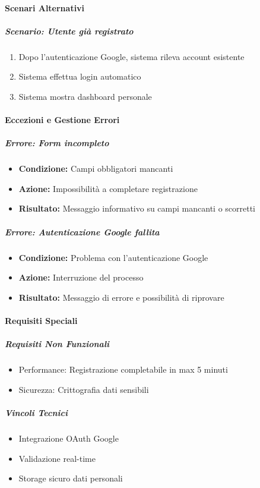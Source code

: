 \paragraph{Scenari Alternativi}

\subparagraph{Scenario: Utente già registrato}
\begin{enumerate}
\item Dopo l'autenticazione Google, sistema rileva account esistente
\item Sistema effettua login automatico
\item Sistema mostra dashboard personale
\end{enumerate}

\paragraph{Eccezioni e Gestione Errori}

\subparagraph{Errore: Form incompleto}
\begin{itemize}
\item \textbf{Condizione:} Campi obbligatori mancanti
\item \textbf{Azione:} Impossibilità a completare registrazione
\item \textbf{Risultato:} Messaggio informativo su campi mancanti o scorretti
\end{itemize}

\subparagraph{Errore: Autenticazione Google fallita}
\begin{itemize}
\item \textbf{Condizione:} Problema con l'autenticazione Google
\item \textbf{Azione:} Interruzione del processo
\item \textbf{Risultato:} Messaggio di errore e possibilità di riprovare
\end{itemize}

\paragraph{Requisiti Speciali}

\subparagraph{Requisiti Non Funzionali}
\begin{itemize}
\item Performance: Registrazione completabile in max 5 minuti
\item Sicurezza: Crittografia dati sensibili
\end{itemize}

\subparagraph{Vincoli Tecnici}
\begin{itemize}
\item Integrazione OAuth Google
\item Validazione real-time
\item Storage sicuro dati personali
\end{itemize}

